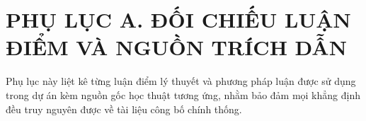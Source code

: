 
\chapter*{PHỤ LỤC A. ĐỐI CHIẾU LUẬN ĐIỂM VÀ NGUỒN TRÍCH DẪN}
\label{app:nguon}

Phụ lục này liệt kê từng luận điểm lý thuyết và phương pháp luận được sử dụng trong dự án kèm nguồn gốc học thuật tương ứng, nhằm bảo đảm mọi khẳng định đều truy nguyên được về tài liệu công bố chính thống.

